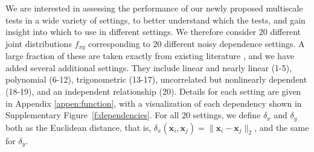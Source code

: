 \documentclass[11pt]{article}
\providecommand{\sct}[1]{{\normalfont\textsc{#1}}}
\providecommand{\mb}[1]{\boldsymbol{#1}}
\newcommand{\Mgc}{\sct{Mgc}}
\newcommand{\Mgcm}{\sct{Mgc$_M$}}
\newcommand{\Hhg}{\sct{Hhg}}
\newcommand{\Dcorr}{\sct{Dcorr}}
\newcommand{\Mcorr}{\sct{Mcorr}}
\newcommand{\Mantel}{\sct{Mantel}}
\newcommand{\mbx}{\ensuremath{\mb{x}}}
\begin{document}
We are interested in assessing the performance of our newly proposed multiscale tests in a wide variety of settings, to better understand which the tests, and gain insight into which to use in different settings.  
We therefore consider $20$ different joint distributions $f_{xy}$ corresponding to $20$ different noisy dependence settings. A large fraction of these are taken exactly from existing literature \cite{SzekelyRizzoBakirov2007, SimonTibshirani2012, GorfineHellerHeller2012, HellerGorfine2013}, and we have added several additional settings.  They include
linear and nearly linear  (1-5),
polynomial   (6-12),
trigonometric (13-17),
uncorrelated but nonlinearly dependent  (18-19),
and an independent relationship (20).
Details for each setting are given in Appendix \ref{appen:function}, with a visualization of each dependency shown in Supplementary Figure~\ref{f:dependencies}. For all $20$ settings, we define  $\delta_x$ and $\delta_y$ both as the Euclidean distance, that is, $\delta_x(\mbx_i,\mbx_j) = \|\mbx_i - \mbx_j\|_{2}$, and the same for $\delta_y$.
\end{document}
